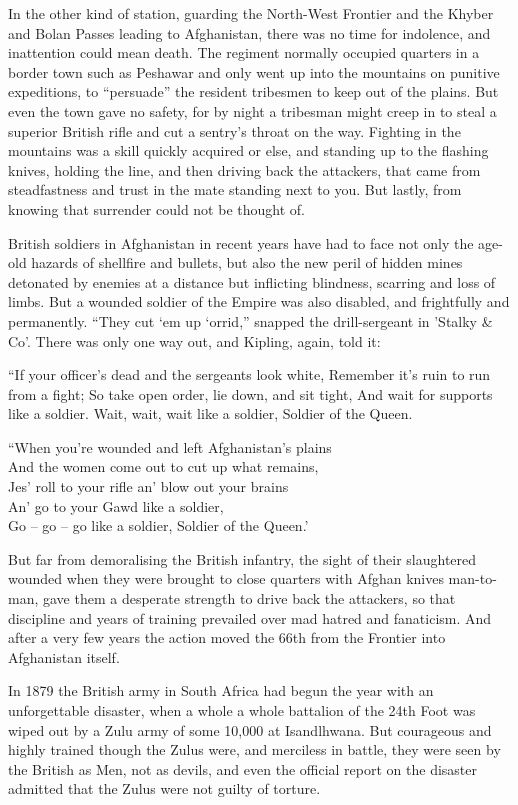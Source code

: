 In the other kind of station, guarding the North-West Frontier and the Khyber and Bolan Passes leading to Afghanistan, there was no time for indolence, and inattention could mean death. The regiment normally occupied quarters in a border town such as Peshawar and only went up into the mountains on punitive expeditions, to “persuade” the resident tribesmen to keep out of the plains. But even the town gave no safety, for by night a tribesman might creep in to steal a superior British rifle and cut a sentry’s throat on the way. Fighting in the mountains was a skill quickly acquired or else, and standing up to the flashing knives, holding the line, and then driving back the attackers, that came from steadfastness and trust in the mate standing next to you. But lastly, from knowing that surrender could not be thought of. 

British soldiers in Afghanistan in recent years have had to face not only the age-old hazards of shellfire and bullets, but also the new peril of hidden mines detonated by enemies at a distance but inflicting blindness, scarring and loss of limbs. But a wounded soldier of the Empire was also disabled, and frightfully and permanently. “They cut ‘em up ‘orrid,” snapped the drill-sergeant in 'Stalky \& Co'. There was only one way out, and Kipling, again, told it:

“If your officer’s dead and the sergeants look white, Remember it’s ruin to run from a fight; 	 So take open order, lie down, and sit tight, 	And wait for supports like a soldier. 		 Wait, wait, wait like a soldier, Soldier of the Queen.

“When you’re wounded and left Afghanistan’s plains\\
And the women come out to cut up what remains, \\
Jes’ roll to your rifle an’ blow out your brains \\
An’ go to your Gawd like a soldier,\\
Go – go – go like a soldier, Soldier of the Queen.’ 

But far from demoralising the British infantry, the sight of their slaughtered wounded when they were brought to close quarters with Afghan knives man-to-man, gave them a desperate strength to drive back the attackers, so that discipline and years of training prevailed over mad hatred and fanaticism. And after a very few years the action moved the 66th from the Frontier into Afghanistan itself. 

In 1879 the British army in South Africa had begun the year with an unforgettable disaster, when a whole a whole battalion of the 24th Foot was wiped out by a Zulu army of some 10,000 at Isandlhwana. But courageous and highly trained though the Zulus were, and merciless in battle, they were seen by the British as Men, not as devils, and even the official report on the disaster admitted that the Zulus were not guilty of torture.

